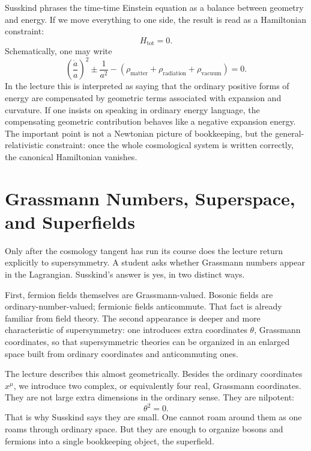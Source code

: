 Susskind phrases the time-time Einstein equation as a balance between geometry and energy. If we move everything to one side, the result is read as a Hamiltonian constraint:
\begin{equation}
H_{\mathrm{tot}}=0.
\end{equation}
Schematically, one may write
\begin{equation}
\left(\frac{\dot a}{a}\right)^2 \pm \frac{1}{a^2}
-
\left(
\rho_{\mathrm{matter}}+\rho_{\mathrm{radiation}}+\rho_{\mathrm{vacuum}}
\right)
=0.
\end{equation}
In the lecture this is interpreted as saying that the ordinary positive forms of energy are compensated by geometric terms associated with expansion and curvature. If one insists on speaking in ordinary energy language, the compensating geometric contribution behaves like a negative expansion energy. The important point is not a Newtonian picture of bookkeeping, but the general-relativistic constraint: once the whole cosmological system is written correctly, the canonical Hamiltonian vanishes.

\section{Grassmann Numbers, Superspace, and Superfields}

Only after the cosmology tangent has run its course does the lecture return explicitly to supersymmetry. A student asks whether Grassmann numbers appear in the Lagrangian. Susskind's answer is yes, in two distinct ways.

First, fermion fields themselves are Grassmann-valued. Bosonic fields are ordinary-number-valued; fermionic fields anticommute. That fact is already familiar from field theory. The second appearance is deeper and more characteristic of supersymmetry: one introduces extra coordinates \(\theta\), Grassmann coordinates, so that supersymmetric theories can be organized in an enlarged space built from ordinary coordinates and anticommuting ones.

The lecture describes this almost geometrically. Besides the ordinary coordinates \(x^\mu\), we introduce two complex, or equivalently four real, Grassmann coordinates. They are not large extra dimensions in the ordinary sense. They are nilpotent:
\begin{equation}
\theta^2=0.
\end{equation}
That is why Susskind says they are small. One cannot roam around them as one roams through ordinary space. But they are enough to organize bosons and fermions into a single bookkeeping object, the superfield.

